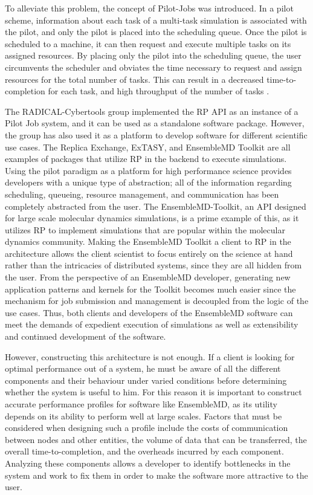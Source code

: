 \documentclass[]{article}
\begin{document}
		To alleviate this problem, the concept of Pilot-Jobs was introduced. In a pilot scheme, information about each task of a multi-task simulation is associated with the pilot, and only the pilot is placed into the scheduling queue. Once the pilot is scheduled to a machine, it can then request and execute multiple tasks on its assigned resources. By placing only the pilot into the scheduling queue, the user circumvents the scheduler and obviates the time necessary to request and assign resources for the total number of tasks. This can result in a decreased time-to-completion for each task, and high throughput of the number of tasks \cite{rp_paper}.

		The RADICAL-Cybertools group implemented the RP API as an instance of a Pilot Job system, and it can be used as a standalone software package. However, the group has also used it as a platform to develop software for different scientific use cases. The Replica Exchange, ExTASY, and EnsembleMD Toolkit are all examples of packages that utilize RP in the backend to execute simulations. Using the pilot paradigm as a platform for high performance science provides developers with a unique type of abstraction; all of the information regarding scheduling, queueing, resource management, and communication has been completely abstracted from the user. The EnsembleMD-Toolkit, an API designed for large scale molecular dynamics simulations, is a prime example of this, as it utilizes RP to implement simulations that are popular within the molecular dynamics community. Making the EnsembleMD Toolkit a client to RP in the architecture allows the client scientist to focus entirely on the science at hand rather than the intricacies of distributed systems, since they are all hidden from the user. From the perspective of an EnsembleMD developer, generating new application patterns and kernels for the Toolkit becomes much easier since the mechanism for job submission and management is decoupled from the logic of the use cases. Thus, both clients and developers of the EnsembleMD software can meet the demands of expedient execution of simulations as well as extensibility and continued development of the software.

		However, constructing this architecture is not enough. If a client is looking for optimal performance out of a system, he must be aware of all the different components and their behaviour under varied conditions before determining whether the system is useful to him. For this reason it is important to construct accurate performance profiles for software like EnsembleMD, as its utility depends on its ability to perform well at large scales. Factors that must be considered when designing such a profile include the costs of communication between nodes and other entities, the volume of data that can be transferred, the overall time-to-completion, and the overheads incurred by each component. Analyzing these components allows a developer to identify bottlenecks in the system and work to fix them in order to make the software more attractive to the user.
\end{document}

